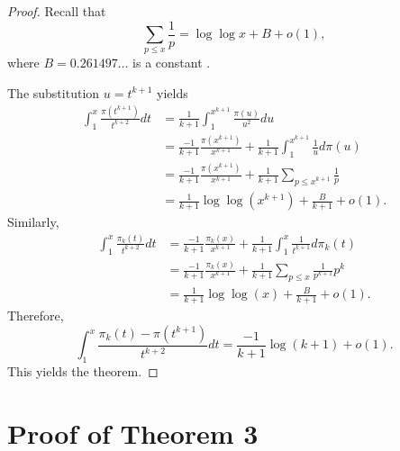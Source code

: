 \documentclass[12pt]{amsart}
\begin{document}
\begin{proof}
Recall that
$$
\sum_{p\le x} \frac1p = \log\log x + B + o(1),
$$
where $B= 0.261497\dots$ is a constant \cite{RS}.

The substitution $u=t^{k+1}$ yields
\begin{align*}
\int_1^x \frac{\pi(t^{k+1})}{t^{k+2}} dt &= \frac{1}{k+1} \int_1^{x^{k+1}}\frac{\pi(u) }{u^2} du\\
&= \frac{-1}{k+1}\frac{\pi(x^{k+1})}{x^{k+1}} + \frac{1}{k+1} \int_1^{x^{k+1}} \frac{1}{u} d\pi(u)\\
&=\frac{-1}{k+1}\frac{\pi(x^{k+1})}{x^{k+1}} +\frac{1}{k+1}\sum_{p\le x^{k+1}} \frac1p \\
&= \frac{1}{k+1} \log\log (x^{k+1}) + \frac{B}{k+1} + o(1).
\end{align*}
Similarly,
\begin{align*}
\int_1^x \frac{\pi_k(t)}{t^{k+2}} dt &=  \frac{-1}{k+1} \frac{\pi_k(x)}{x^{k+1}} + \frac{1}{k+1}\int_1^x \frac{1}{t^{k+1}}d\pi_k(t)\\
&= \frac{-1}{k+1} \frac{\pi_k(x)}{x^{k+1}} + \frac{1}{k+1}\sum_{p\le x} \frac{1}{p^{k+1}}p^k\\
&= \frac{1}{k+1} \log\log (x) + \frac{B}{k+1} + o(1).
\end{align*}
Therefore,
$$
\int_1^x \frac{\pi_k(t) - \pi(t^{k+1})}{t^{k+2}} dt = \frac{-1}{k+1} \log(k+1) + o(1).
$$
This yields the theorem.\end{proof}

\section{Proof of Theorem 3}
\end{document}
